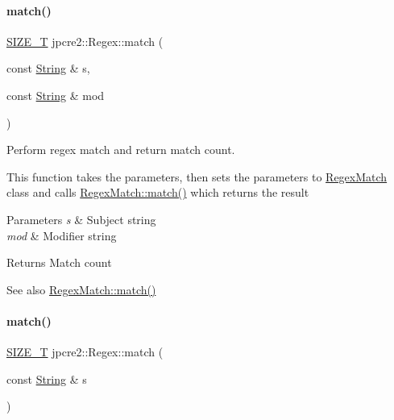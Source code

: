 \paragraph{\texorpdfstring{match()}{match()}\hspace{0.1cm}{\footnotesize\ttfamily [1/2]}}
{\footnotesize\ttfamily \hyperlink{namespacejpcre2_a2aac465ddcb123560c7c8215dd69246c}{S\+I\+Z\+E\+\_\+T} jpcre2\+::\+Regex\+::match (\begin{DoxyParamCaption}\item[{const \hyperlink{namespacejpcre2_a91f03070152fb228bc116c5a737f1d16}{String} \&}]{s,  }\item[{const \hyperlink{namespacejpcre2_a91f03070152fb228bc116c5a737f1d16}{String} \&}]{mod }\end{DoxyParamCaption})\hspace{0.3cm}{\ttfamily [inline]}}



Perform regex match and return match count. 

This function takes the parameters, then sets the parameters to \hyperlink{classjpcre2_1_1RegexMatch}{Regex\+Match} class and calls \hyperlink{classjpcre2_1_1RegexMatch_a5868aef3a146594ea1ebef34d122bb33_a5868aef3a146594ea1ebef34d122bb33}{Regex\+Match\+::match()} which returns the result 
\begin{DoxyParams}{Parameters}
{\em s} & Subject string \\
\hline
{\em mod} & Modifier string \\
\hline
\end{DoxyParams}
\begin{DoxyReturn}{Returns}
Match count 
\end{DoxyReturn}
\begin{DoxySeeAlso}{See also}
\hyperlink{classjpcre2_1_1RegexMatch_a5868aef3a146594ea1ebef34d122bb33_a5868aef3a146594ea1ebef34d122bb33}{Regex\+Match\+::match()} 
\end{DoxySeeAlso}
\hypertarget{classjpcre2_1_1Regex_a9ffbb6aa54cb97125f1b4211bc1d09a5_a9ffbb6aa54cb97125f1b4211bc1d09a5}{}\label{classjpcre2_1_1Regex_a9ffbb6aa54cb97125f1b4211bc1d09a5_a9ffbb6aa54cb97125f1b4211bc1d09a5} 
\paragraph{\texorpdfstring{match()}{match()}\hspace{0.1cm}{\footnotesize\ttfamily [2/2]}}
{\footnotesize\ttfamily \hyperlink{namespacejpcre2_a2aac465ddcb123560c7c8215dd69246c}{S\+I\+Z\+E\+\_\+T} jpcre2\+::\+Regex\+::match (\begin{DoxyParamCaption}\item[{const \hyperlink{namespacejpcre2_a91f03070152fb228bc116c5a737f1d16}{String} \&}]{s }\end{DoxyParamCaption})\hspace{0.3cm}{\ttfamily [inline]}}



